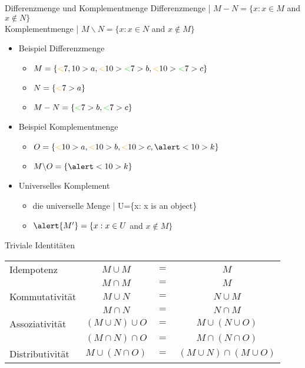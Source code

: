 \begin{frame}
  {Differenzmenge und Komplementmenge}
  \onslide<+->
  \onslide<+->
  Differenzmenge | \alert{$M-N=\{x: x\in M$ and $x\not\in N\}$}\\
  \onslide<+->
  Komplementmenge | \alert{$M\backslash N=\{x: x\in N$ and $x\not\in M\}$}\\
  \Halbzeile
  \begin{itemize}[<+->]
    \item Beispiel Differenzmenge
      \begin{itemize}[<+->]
        \item $M=\{\orongsch<7,10>{a},\orongsch<10>{\gruen<7>{b}},\orongsch<10>{\gruen<7>{c}}\}$
        \item $N=\{\orongsch<7>{a}\}$
        \item $M-N=\{\gruen<7>{b},\gruen<7>{c}\}$
      \end{itemize}
      \Halbzeile
    \item Beispiel Komplementmenge
      \begin{itemize}[<+->]
        \item $O=\{\orongsch<10>{a},\orongsch<10>{b},\orongsch<10>{c},\alert<10>{k}\}$
        \item $M\backslash O=\{\alert<10>{k}\}$
      \end{itemize}
      \Halbzeile
    \item Universelles Komplement
      \begin{itemize}[<+->]
        \item die universelle Menge | U=\{x: x is an object\}
        \item $\alert{M^{\prime}}=\{x: x\in U$ and $x\not\in M\}$
      \end{itemize}
  \end{itemize}
\end{frame}

\begin{frame}
  {Triviale Identitäten}
  \onslide<+->
  \onslide<+->
  \centering 
  \begin{tabular}[h]{lccc}
    Idempotenz      & $M\cup M$ & $=$ & $M$ \\
                    & $M\cap M$ & $=$ & $M$ \\
   Kommutativität   & $M\cup N$ & $=$ & $N\cup M$ \\
                    & $M\cap N$ & $=$ & $N\cap M$ \\
   Assoziativität   & $(M\cup N)\cup O$ & $=$ & $M\cup (N\cup O)$ \\
                    & $(M\cap N)\cap O$ & $=$ & $M\cap (N\cap O)$ \\
   Distributivität  & $M\cup (N\cap O)$ & $=$ & $(M\cup N)\cap (M\cup O)$ \\
  \end{tabular}
\end{frame}

